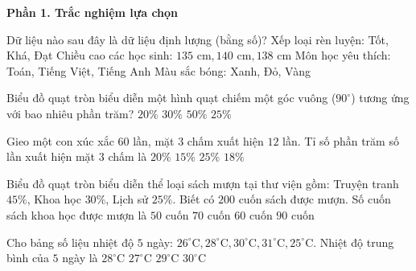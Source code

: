\textbf{Phần 1. Trắc nghiệm lựa chọn}

\begin{ex} %
Dữ liệu nào sau đây là dữ liệu định lượng (bằng số)?
\choice
{Xếp loại rèn luyện: Tốt, Khá, Đạt}
{\True Chiều cao các học sinh: $135\text{ cm}, 140\text{ cm}, 138\text{ cm}$}
{Môn học yêu thích: Toán, Tiếng Việt, Tiếng Anh}
{Màu sắc bóng: Xanh, Đỏ, Vàng}
\end{ex}

\begin{ex} %
Biểu đồ quạt tròn biểu diễn một hình quạt chiếm một góc vuông ($90^\circ$) tương ứng với bao nhiêu phần trăm?
\choice
{$20\%$}
{$30\%$}
{$50\%$}
{\True $25\%$}
\end{ex}

\begin{ex} %
Gieo một con xúc xắc $60$ lần, mặt $3$ chấm xuất hiện $12$ lần. Tỉ số phần trăm số lần xuất hiện mặt $3$ chấm là
\choice
{\True $20\%$}
{$15\%$}
{$25\%$}
{$18\%$}
\end{ex}

\begin{ex} %
Biểu đồ quạt tròn biểu diễn thể loại sách mượn tại thư viện gồm: Truyện tranh $45\%$, Khoa học $30\%$, Lịch sử $25\%$. Biết có $200$ cuốn sách được mượn. Số cuốn sách khoa học được mượn là
\choice
{$50$ cuốn}
{$70$ cuốn}
{\True $60$ cuốn}
{$90$ cuốn}
\end{ex}

\begin{ex} %
Cho bảng số liệu nhiệt độ $5$ ngày: $26^\circ\text{C}, 28^\circ\text{C}, 30^\circ\text{C}, 31^\circ\text{C}, 25^\circ\text{C}$. Nhiệt độ trung bình của $5$ ngày là
\choice
{\True $28^\circ\text{C}$}
{$27^\circ\text{C}$}
{$29^\circ\text{C}$}
{$30^\circ\text{C}$}
\end{ex}

